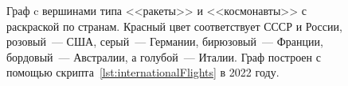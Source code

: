 \begin{figure}[h]
  \setlength{\fboxsep}{0pt}%
  \setlength{\fboxrule}{1pt}%
  \caption[Граф c вершинами типа <<ракеты>> и <<космонавты>> с раскраской по странам]{Граф c вершинами типа <<ракеты>> и <<космонавты>> с раскраской по странам. Красный цвет соответствует СССР и России, розовый~--- США, серый~--- Германии, бирюзовый~--- Франции, бордовый~--- Австралии, а голубой~--- Италии. Граф построен с помощью скрипта~\protect\ref{lst:internationalFlights} в 2022 году.}
  \label{fig:internationalFlights}%
\end{figure}
